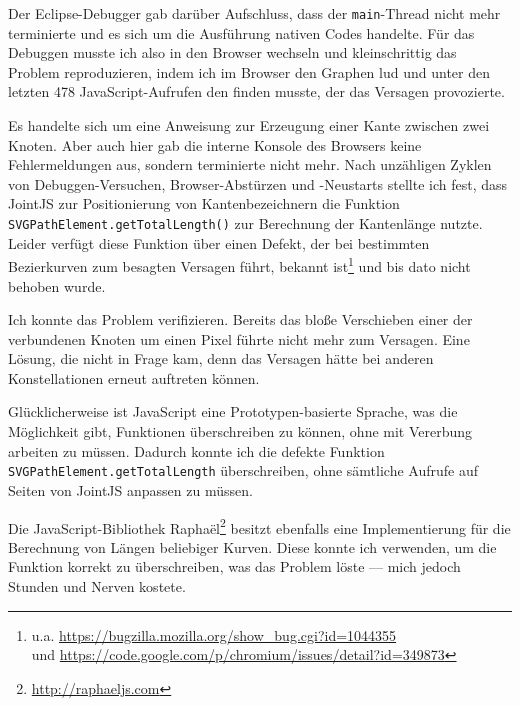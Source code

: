 Der Eclipse-Debugger gab darüber Aufschluss, dass der \texttt{main}-Thread nicht mehr terminierte und es sich um die Ausführung nativen Codes handelte. Für das Debuggen musste ich also in den Browser wechseln und kleinschrittig das Problem reproduzieren, indem ich im Browser den Graphen lud und unter den letzten 478 JavaScript-Aufrufen den finden musste, der das Versagen provozierte.

Es handelte sich um eine Anweisung zur Erzeugung einer Kante zwischen zwei Knoten. Aber auch hier gab die interne Konsole des Browsers keine Fehlermeldungen aus, sondern terminierte nicht mehr. Nach unzähligen Zyklen von Debuggen-Versuchen, Browser-Abstürzen und -Neustarts stellte ich fest, dass JointJS zur Positionierung von Kantenbezeichnern die Funktion \texttt{SVGPathElement.getTotalLength()} zur Berechnung der Kantenlänge nutzte. Leider verfügt diese Funktion über einen Defekt, der bei bestimmten Bezierkurven zum besagten Versagen führt, bekannt ist\footnote{u.a. \url{https://bugzilla.mozilla.org/show_bug.cgi?id=1044355}\\und \url{https://code.google.com/p/chromium/issues/detail?id=349873}} und bis dato nicht behoben wurde.

Ich konnte das Problem verifizieren. Bereits das bloße Verschieben einer der verbundenen Knoten um einen Pixel führte nicht mehr zum Versagen. Eine Lösung, die nicht in Frage kam, denn das Versagen hätte bei anderen Konstellationen erneut auftreten können.

Glücklicherweise ist JavaScript eine Prototypen-basierte Sprache, was die Möglichkeit gibt, Funktionen überschreiben zu können, ohne mit Vererbung arbeiten zu müssen. Dadurch konnte ich die defekte Funktion \texttt{SVGPathElement.getTotalLength} überschreiben, ohne sämtliche Aufrufe auf Seiten von JointJS anpassen zu müssen.

Die JavaScript-Bibliothek Raphaël\footnote{\url{http://raphaeljs.com}} besitzt ebenfalls eine Implementierung für die Berechnung von Längen beliebiger Kurven. Diese konnte ich verwenden, um die Funktion korrekt zu überschreiben, was das Problem löste --- mich jedoch Stunden und Nerven kostete.%


